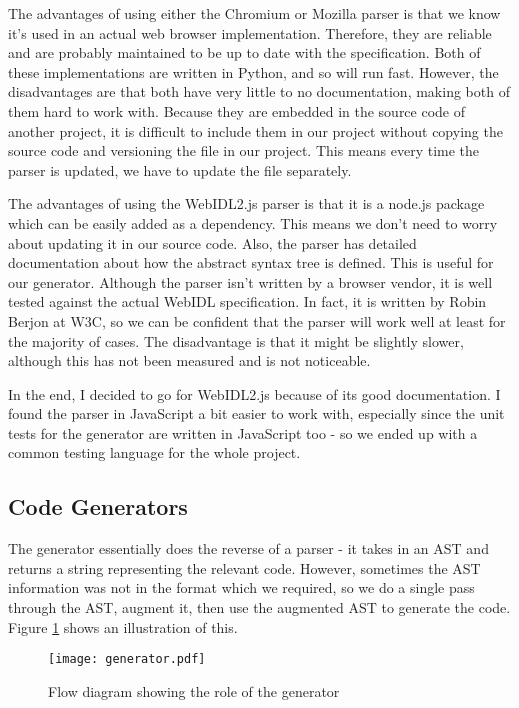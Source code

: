The advantages of using either the Chromium or Mozilla parser is that we know it's used in an actual web browser implementation. Therefore, they are reliable and are probably maintained to be up to date with the specification. Both of these implementations are written in Python, and so will run fast. However, the disadvantages are that both have very little to no documentation, making both of them hard to work with. Because they are embedded in the source code of another project, it is difficult to include them in our project without copying the source code and versioning the file in our project. This means every time the parser is updated, we have to update the file separately.

The advantages of using the WebIDL2.js parser is that it is a node.js package which can be easily added as a dependency. This means we don't need to worry about updating it in our source code. Also, the parser has detailed documentation about how the abstract syntax tree is defined. This is useful for our generator. Although the parser isn't written by a browser vendor, it is well tested against the actual WebIDL specification. In fact, it is written by Robin Berjon at W3C, so we can be confident that the parser will work well at least for the majority of cases. The disadvantage is that it might be slightly slower, although this has not been measured and is not noticeable. 

In the end, I decided to go for WebIDL2.js because of its good documentation. I found the parser in JavaScript a bit easier to work with, especially since the unit tests for the generator are written in JavaScript too - so we ended up with a common testing language for the whole project.




\subsection{Code Generators} %
\label{sub:code_generators_design}
The generator essentially does the reverse of a parser - it takes in an AST and returns a string representing the relevant code. However, sometimes the AST information was not in the format which we required, so we do a single pass through the AST, augment it, then use the augmented AST to generate the code. Figure \ref{fig:generator-diagram} shows an illustration of this.

\begin{figure}
    \centering
    \texttt{[image: generator.pdf]} 
    \caption{Flow diagram showing the role of the generator}
    \label{fig:generator-diagram}
\end{figure}

